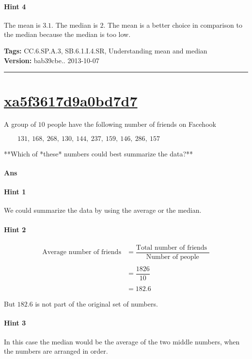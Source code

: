 \documentclass[twocolumn,10pt]{article}
\begin{document}
\paragraph{Hint 4}The mean is $3.1$.  The median is $2$.  The mean is a better choice in comparison to the median because the median is too low.



\medskip
\noindent
\textbf{Tags:} {\footnotesize CC.6.SP.A.3, SB.6.1.I.4.SR, Understanding mean and median}\\
\textbf{Version:} bab39cbe.. 2013-10-07
\smallskip\hrule





\section{\href{https://www.khanacademy.org/devadmin/content/items/xa5f3617d9a0bd7d7}{xa5f3617d9a0bd7d7}}

\noindent
A group of $10$ people have the following number of friends on Facehook

$\qquad131,~168,~268,~130,~144,~237,~159,~146,~286,~157$

**Which of *these* numbers could best summarize the data?**


\paragraph{Ans} 

\paragraph{Hint 1}We could summarize the data by using the average or the median. 

\paragraph{Hint 2}\begin{align*}\text{Average number of friends} &= \dfrac{\text{Total number of friends }}{\text{Number of people}}\\ 
\\
&= \dfrac{1826}{10}\\
\\
&=182.6\end{align*}

But $182.6$ is not part of the original set of numbers.

\paragraph{Hint 3}In this case the median would be the average of the two middle numbers, when the numbers are arranged in order.
\end{document}
